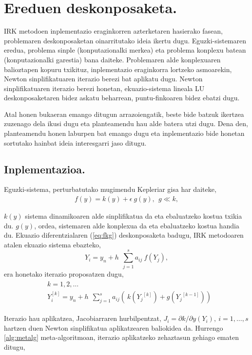 \section{Ereduen deskonposaketa.}


IRK metodoen inplementazio eraginkorren azterketaren hasierako fasean, problemaren deskonposaketan oinarritutako ideia ikertu dugu. Eguzki-sistemaren eredua, problema sinple (konputazionalki merkea) eta problema konplexu batean (konputazionalki garestia) bana daiteke.   
Problemaren alde konplexuaren balioztapen kopuru txikituz, inplementazio eraginkorra lortzeko asmoarekin, Newton sinplifikatuaren iterazio berezi bat aplikatu dugu. Newton sinplifikatuaren iterazio berezi honetan, ekuazio-sistema lineala LU deskonposaketaren bidez askatu beharrean, puntu-finkoaren bidez ebatzi dugu.

Atal honen bukaeran emango ditugun arrazoiengatik, beste bide batzuk ikertzea zuzenago dela ikusi dugu eta planteamendu hau alde batera utzi dugu. Dena den, planteamendu honen laburpen bat emango dugu eta inplementazio bide honetan sortutako hainbat ideia interesgarri jaso ditugu.

\subsection*{Inplementazioa.}
Eguzki-sistema, perturbatutako mugimendu Kepleriar gisa har daiteke,  
\begin{align}
\label{eq:fkg}
 f(y)=  k(y) + \epsilon \ g (y), \ \ g\ll k,   
\end{align}
 
$k(y)$ sistema dinamikoaren alde sinplifikatua da eta ebaluatzeko kostua txikia du. $g(y)$, ordea, sistemaren alde konplexua da eta ebaluatzeko kostua handia du. Ekuazio diferentzialaren (\ref{eq:fkg}) deskonposaketa badugu, IRK metodoaren atalen ekuazio sistema ebazteko,
\begin{equation*}
Y_i=y_n+h\ \ \sum^s_{j=1}{a_{ij} \ f({Y_j}) },  
\end{equation*} 
era honetako iterazio proposatzen dugu,
\begin{align}
\begin{split}
&k=1,2,\dots \\
&Y_i^{[k]}=y_n+h\ \ \sum^s_{j=1}{a_{ij}(\ k({Y_j}^{[k]})+g({Y_j}^{[k-1]})) }
\end{split}
\end{align}

Iterazio hau aplikatzea, Jacobiarraren hurbilpentzat, $J_i=\partial k/ \partial y (Y_i), \ i=1,\dots,s$ hartzen duen Newton sinplifikatua aplikatzearen baliokidea da. Hurrengo \ref{alg:metalg} meta-algoritmoan, iterazio aplikatzeko zehaztasun gehiago ematen ditugu,
 
